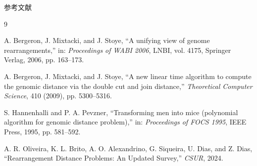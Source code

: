 \documentclass[unicode, 11pt, aspectratio=169]{beamer}
\begin{document}
\begin{frame}[allowframebreaks]{参考文献}
\begin{thebibliography}{9}

	A. Bergeron, J. Mixtacki, and J. Stoye, ``A unifying view of genome rearrangements,'' in: \textit{Proceedings of WABI 2006}, LNBI, vol. 4175, Springer Verlag, 2006, pp. 163--173.

	A. Bergeron, J. Mixtacki, and J. Stoye, ``A new linear time algorithm to compute the genomic distance via the double cut and join distance,'' \textit{Theoretical Computer Science}, 410 (2009), pp. 5300--5316.

	S. Hannenhalli and P. A. Pevzner, ``Transforming men into mice (polynomial algorithm for genomic distance problem),'' in: \textit{Proceedings of FOCS 1995}, IEEE Press, 1995, pp. 581--592.

	A. R. Oliveira, K. L. Brito, A. O. Alexandrino, G. Siqueira, U. Dias, and Z. Dias, ``Rearrangement Distance Problems: An Updated Survey,'' \textit{CSUR}, 2024.

\end{thebibliography}
\end{frame}


\end{document}
